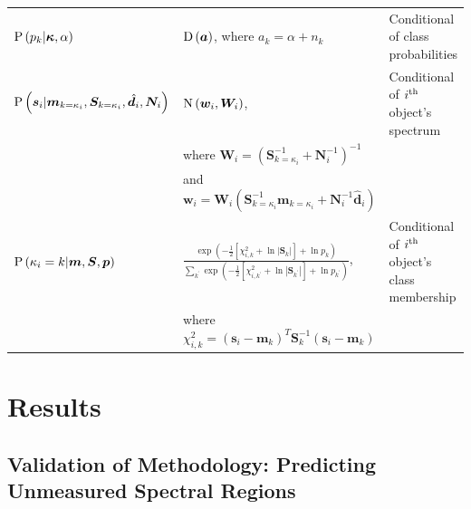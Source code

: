 \documentclass[a4paper,fleqn,usenatbib]{mnras}
\newcommand{\prob}{{\rm P}}
\newcommand{\normal}{{\rm{N}}}
\newcommand{\dirichlet}{{\rm D}}
\newcommand{\alphas}{{\bm a}}
\newcommand{\specmean}{{\bm m}}
\newcommand{\speccov}{{\bm S}}
\newcommand{\classprob}{{p}}
\newcommand{\classprobs}{{\bm p}}
\newcommand{\objspec}{{\bm s}}
\newcommand{\objclass}{{\kappa}}
\newcommand{\objclasses}{{\bm \kappa}}
\newcommand{\objdata}{\hat{\bm d}}
\newcommand{\objnoise}{{\bm N}}
\newcommand{\wfmean}{{\bm w}}
\newcommand{\wfcov}{{\bm W}}
\begin{document}
\begin{table}
\begin{tabular}{lll}
        $\prob\left(\classprob_k | \objclasses, \alpha\right)$ & $\dirichlet\left(\alphas\right)$, where $a_k = \alpha + n_k$ & Conditional of class probabilities \\
        $\prob \left( \objspec_i | \specmean_{k=\objclass_i}, \speccov_{k=\objclass_i}, \objdata_i, \objnoise_i \right)$ & $\normal \left( \wfmean_i, \wfcov_i \right)$, & Conditional of $i^{\rm th}$ object's spectrum \\
         & where $\wfcov_i = \left( \speccov_{k=\objclass_i}^{-1} + \objnoise_i^{-1} \right)^{-1}$ &  \\
         & and $\wfmean_i = \wfcov_i \left( \speccov_{k=\objclass_i}^{-1} \specmean_{k=\objclass_i} + \objnoise_i^{-1} \objdata_i \right)$ &  \\
        $\prob \left( \objclass_i = k | \specmean, \speccov, \classprobs \right)$ & $ \frac{ \exp \left( -\frac{1}{2} \left[ \chi^2_{i,k} + \ln \left| \speccov_k \right| \right] + \ln \classprob_k \right) }{ \sum_{k^\prime} \exp \left( -\frac{1}{2} \left[ \chi^2_{i,k^\prime} + \ln \left| \speccov_{k^\prime} \right| \right] + \ln \classprob_{k^\prime} \right) }$, & Conditional of $i^{\rm th}$ object's class membership \\
         & where $\chi^2_{i,k} = \left( \objspec_i - \specmean_k \right)^T \speccov_k^{-1} \left( \objspec_i - \specmean_k \right) $ &  \\
        \hline
    \end{tabular}
\end{table}



\section{Results}

\subsection{Validation of Methodology: Predicting Unmeasured Spectral Regions}
\end{document}
